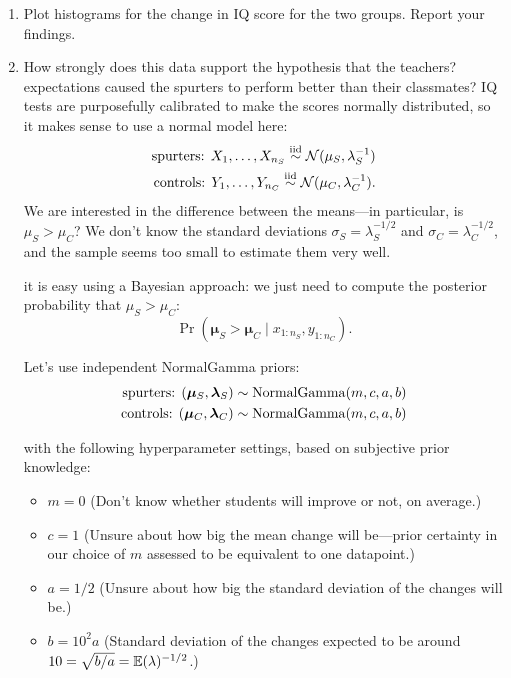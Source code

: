 \documentclass{article}
\begin{document}
\begin{enumerate}
\item Plot histograms for the change in IQ score for the two groups. Report your findings. 
\item How strongly does this data support the hypothesis that the teachers? expectations caused the spurters to perform better than their classmates? 
IQ tests are purposefully calibrated to make the scores normally distributed, so it makes sense to use a normal model here:
\begin{align*}
\text{spurters: } X_1,\dotsc,X_{n_S}\stackrel{\mathrm{iid}}{\sim} \mathcal{N}(\mu_S,\lambda_S^{-1})\\
\text{controls: } Y_1,\dotsc,Y_{n_C}\stackrel{\mathrm{iid}}{\sim} \mathcal{N}(\mu_C,\lambda_C^{-1}).
\end{align*}
We are interested in the difference between the means---in particular, is $\mu_S>\mu_C$?
We don't know the standard deviations $\sigma_S=\lambda_S^{-1/2}$ and $\sigma_C=\lambda_C^{-1/2}$, and the sample seems too small to estimate them very well.

it is easy using a Bayesian approach: we just need to compute the posterior probability that $\mu_S>\mu_C$:
$$ \Pr(\bm\mu_S > \bm\mu_C \mid x_{1:n_S},y_{1:n_C}). $$

Let's use independent NormalGamma priors:
\begin{align*}
\text{spurters: } (\bm\mu_S,\bm\lambda_S) \sim \operatorname*{NormalGamma}(m,c,a,b)\\
\text{controls: } (\bm\mu_C,\bm\lambda_C) \sim \operatorname*{NormalGamma}(m,c,a,b)
\end{align*}

with the following hyperparameter settings, based on subjective prior knowledge:
\begin{itemize}
\item $m = 0$ (Don't know whether students will improve or not, on average.)
\item $c = 1$ (Unsure about how big the mean change will be---prior certainty in our choice of $m$ assessed to be equivalent to one datapoint.)
\item $a = 1/2$ (Unsure about how big the standard deviation of the changes will be.)
\item $b = 10^2 a$ (Standard deviation of the changes expected to be around $10 = \sqrt{b/a} = \mathbb{E}(\lambda)^{-1/2}$.)
\end{itemize}


\end{enumerate}
\end{document}

